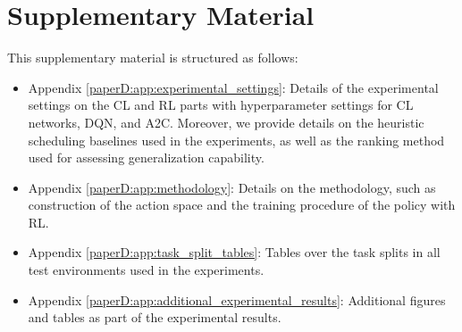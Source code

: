 
\section*{Supplementary Material}

This supplementary material is structured as follows:
\begin{itemize}
    \item Appendix \ref{paperD:app:experimental_settings}: Details of the experimental settings on the CL and RL parts with hyperparameter settings for CL networks, DQN, and A2C. Moreover, we provide details on the heuristic scheduling baselines used in the experiments, as well as the ranking method used for assessing generalization capability. 
    
    \item Appendix \ref{paperD:app:methodology}: Details on the methodology, such as construction of the action space and the training procedure of the policy with RL.
    
    \item Appendix \ref{paperD:app:task_split_tables}: Tables over the task splits in all test environments used in the experiments.  
    
    \item Appendix \ref{paperD:app:additional_experimental_results}: Additional figures and tables as part of the experimental results.  
\end{itemize}




\clearpage
%

%

%


\clearpage


